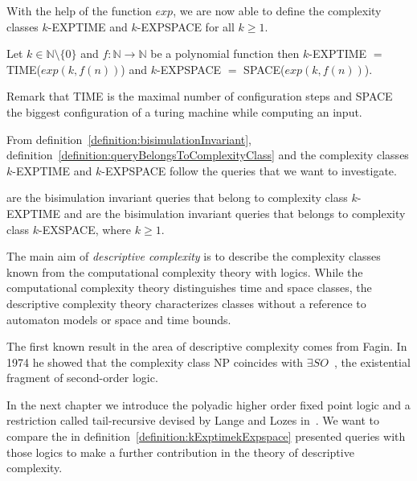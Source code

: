 With the help of the function $exp$, we are now able to define the complexity classes $k$-EXPTIME and $k$-EXPSPACE for
all $k \geq 1$.

\begin{definition}
    Let $k \in \mathbb{N} \setminus \{0\}$ and $f: \mathbb{N} \rightarrow \mathbb{N}$ be a polynomial function then
    $k$-EXPTIME $=$ TIME($exp(k, f(n))$) and $k$-EXPSPACE $=$ SPACE($exp(k, f(n))$).
\end{definition}

Remark that TIME is the maximal number of configuration steps and SPACE the biggest configuration of a turing machine
while computing an input.

From definition~\ref{definition:bisimulationInvariant}, definition~\ref{definition:queryBelongsToComplexityClass}
and the complexity classes $k$-EXPTIME and $k$-EXPSPACE follow the queries that we want to investigate.

\begin{definition}
    \label{definition:kExptimekExpspace}
     are the bisimulation invariant queries that belong to complexity class $k$-EXPTIME and
     are the bisimulation invariant queries that belongs to complexity class $k$-EXSPACE, where $k \geq
    1$.
\end{definition}

The main aim of \emph{descriptive complexity} is to describe the complexity classes known from the
computational complexity theory with logics. While the computational complexity theory distinguishes time and space
classes, the descriptive complexity theory characterizes classes without a reference to automaton models or
space and time bounds.

The first known result in the area of descriptive complexity comes from Fagin. In 1974 he showed that the complexity
class NP coincides with $\exists SO$~\cite{fagin1974generalized}, the existential fragment of second-order logic.

In the next chapter we introduce the polyadic higher order fixed point logic and a restriction called tail-recursive
devised by Lange and Lozes in~\cite{lange2014capturing}. We want to compare the in
definition~\ref{definition:kExptimekExpspace} presented queries with those logics to make a further contribution in
the theory of descriptive complexity.